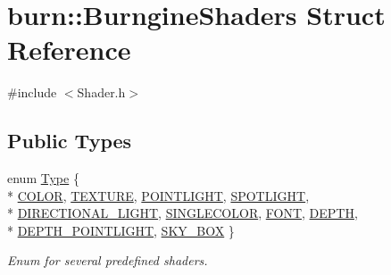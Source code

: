 \hypertarget{structburn_1_1_burngine_shaders}{\section{burn\-:\-:Burngine\-Shaders Struct Reference}
\label{structburn_1_1_burngine_shaders}
}


{\ttfamily \#include $<$Shader.\-h$>$}

\subsection*{Public Types}
\begin{DoxyCompactItemize}
\item 
enum \hyperlink{structburn_1_1_burngine_shaders_a2c339d4b838b7efe94ba8ef7f480ef41}{Type} \{ \\*
\hyperlink{structburn_1_1_burngine_shaders_a2c339d4b838b7efe94ba8ef7f480ef41a446d1261300dfabf6e08f66e60f8ed5c}{C\-O\-L\-O\-R}, 
\hyperlink{structburn_1_1_burngine_shaders_a2c339d4b838b7efe94ba8ef7f480ef41a3862d81a77979610dad2455f8d7613a2}{T\-E\-X\-T\-U\-R\-E}, 
\hyperlink{structburn_1_1_burngine_shaders_a2c339d4b838b7efe94ba8ef7f480ef41ad7d22e0ffe363d94429c03e2c10fb191}{P\-O\-I\-N\-T\-L\-I\-G\-H\-T}, 
\hyperlink{structburn_1_1_burngine_shaders_a2c339d4b838b7efe94ba8ef7f480ef41a5172978e4e2117de6a05416367a1860d}{S\-P\-O\-T\-L\-I\-G\-H\-T}, 
\\*
\hyperlink{structburn_1_1_burngine_shaders_a2c339d4b838b7efe94ba8ef7f480ef41a0386e42429e97f12aa62b0f2541d283a}{D\-I\-R\-E\-C\-T\-I\-O\-N\-A\-L\-\_\-\-L\-I\-G\-H\-T}, 
\hyperlink{structburn_1_1_burngine_shaders_a2c339d4b838b7efe94ba8ef7f480ef41aeb97d831b98acc3f5156874f45971e9f}{S\-I\-N\-G\-L\-E\-C\-O\-L\-O\-R}, 
\hyperlink{structburn_1_1_burngine_shaders_a2c339d4b838b7efe94ba8ef7f480ef41aad14732ddfa6f0cde189b342ceaa66d7}{F\-O\-N\-T}, 
\hyperlink{structburn_1_1_burngine_shaders_a2c339d4b838b7efe94ba8ef7f480ef41ad85ec8bf4f61842aebd3f8023ea14f6e}{D\-E\-P\-T\-H}, 
\\*
\hyperlink{structburn_1_1_burngine_shaders_a2c339d4b838b7efe94ba8ef7f480ef41a72bda762a6e5151c4a63cd8d70a68755}{D\-E\-P\-T\-H\-\_\-\-P\-O\-I\-N\-T\-L\-I\-G\-H\-T}, 
\hyperlink{structburn_1_1_burngine_shaders_a2c339d4b838b7efe94ba8ef7f480ef41ab12073258bb6013b7af990d46b197005}{S\-K\-Y\-\_\-\-B\-O\-X}
 \}
\begin{DoxyCompactList}\small\item\em Enum for several predefined shaders. \end{DoxyCompactList}\end{DoxyCompactItemize}
